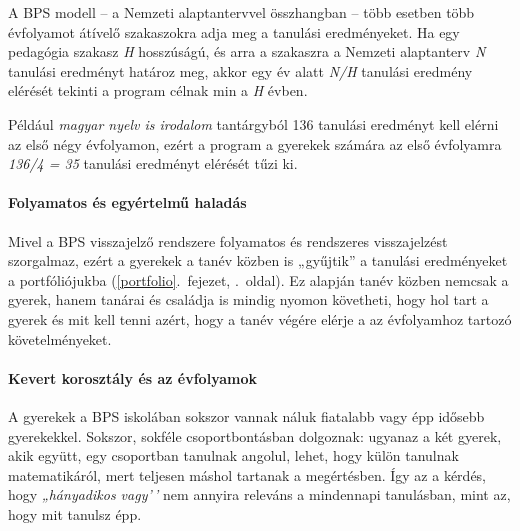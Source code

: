 A BPS modell -- a Nemzeti alaptantervvel összhangban -- több esetben
több évfolyamot átívelő szakaszokra adja meg a tanulási eredményeket. Ha
egy pedagógia szakasz \emph{H} hosszúságú, és arra a szakaszra a Nemzeti
alaptanterv \emph{N} tanulási eredményt határoz meg, akkor egy év alatt
\emph{N/H} tanulási eredmény elérését tekinti a program célnak min a
\emph{H} évben.

Például \emph{magyar nyelv is irodalom} tantárgyból 136 tanulási
eredményt kell elérni az első négy évfolyamon, ezért a program a
gyerekek számára az első évfolyamra \emph{136/4 = 35} tanulási eredményt
elérését tűzi ki.

\hypertarget{folyamatos-es-egyertelmu-haladas}{%
\paragraph{Folyamatos és egyértelmű
haladás}\label{folyamatos-es-egyertelmu-haladas}}

Mivel a BPS visszajelző rendszere folyamatos és rendszeres visszajelzést
szorgalmaz, ezért a gyerekek a tanév közben is „gyűjtik'' a tanulási
eredményeket a
portfóliójukba (\ref{portfolio}.~fejezet, \pageref{portfolio}.~oldal).
Ez alapján tanév közben nemcsak a gyerek, hanem tanárai és családja is
mindig nyomon követheti, hogy hol tart a gyerek és mit kell tenni azért,
hogy a tanév végére elérje a az évfolyamhoz tartozó követelményeket.

\hypertarget{kevert-korosztaly-es-az-evfolyamok}{%
\paragraph{Kevert korosztály és az
évfolyamok}\label{kevert-korosztaly-es-az-evfolyamok}}

A gyerekek a BPS iskolában sokszor vannak náluk fiatalabb vagy épp
idősebb gyerekekkel. Sokszor, sokféle csoportbontásban dolgoznak:
ugyanaz a két gyerek, akik együtt, egy csoportban tanulnak angolul,
lehet, hogy külön tanulnak matematikáról, mert teljesen máshol tartanak
a megértésben. Így az a kérdés, hogy \emph{„hányadikos vagy'\,'} nem
annyira releváns a mindennapi tanulásban, mint az, hogy mit tanulsz épp.

